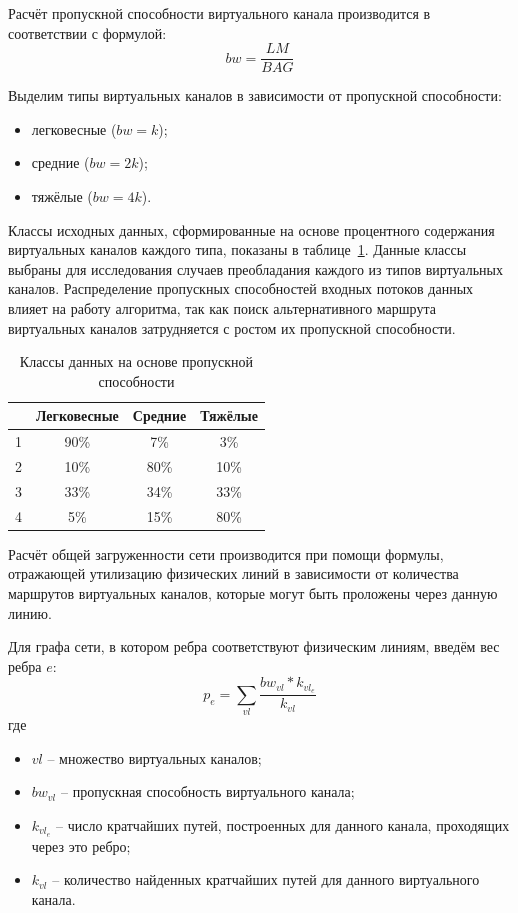 \documentclass[12pt, a4paper]{article}
\begin{document}
Расчёт пропускной способности виртуального канала производится в соответствии с формулой:
$$bw = \frac{LM}{BAG}$$

Выделим типы виртуальных каналов в зависимости от пропускной способности:
\begin{itemize}
	\item легковесные ($bw=k$);
	\item средние ($bw=2k$);
	\item тяжёлые ($bw=4k$).
\end{itemize}

Классы исходных данных, сформированные на основе процентного содержания виртуальных каналов каждого типа, показаны в таблице~\ref{table:bwclass}. Данные классы выбраны для исследования случаев преобладания каждого из типов виртуальных каналов. Распределение пропускных способностей входных потоков данных влияет на работу алгоритма, так как поиск альтернативного маршрута виртуальных каналов затрудняется с ростом их пропускной способности.

\begin{table}[h]
\begin{center}
\begin{tabular}{|c|c|c|c|}
\hline
	 & Легковесные & Средние & Тяжёлые\\
\hline
	1 & 90\% & 7\% & 3\% \\
\hline
 2 & 10\% & 80\% & 10\% \\
\hline
	3 & 33\% & 34\% & 33\% \\
\hline
	4 & 5\% & 15\% & 80\% \\
\hline
\end{tabular}
\end{center}
\caption{Классы данных на основе пропускной способности}
\label{table:bwclass}
\end{table}

Расчёт общей загруженности сети производится при помощи формулы, отражающей утилизацию физических линий в зависимости от количества маршрутов виртуальных каналов, которые могут быть проложены через данную линию.

Для графа сети, в котором ребра соответствуют физическим линиям, введём вес ребра $e$:
$$p_{e} = \sum_{vl}\frac{bw_{vl} \ast k_{vl_e}}{k_{vl}}$$
где 
\begin{itemize}
	\item $vl$ -- множество виртуальных каналов;
	\item $bw_{vl}$ -- пропускная способность виртуального канала;
	\item $k_{vl_e}$ -- число кратчайших путей, построенных для данного канала, проходящих через это ребро;
	\item $k_{vl}$ -- количество найденных кратчайших путей для данного виртуального канала.
\end{itemize}
\end{document}

